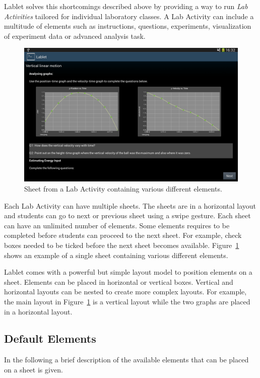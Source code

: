 \documentclass{sigchi}
\begin{document}
Lablet solves this shortcomings described above by providing a way to
run {\em Lab Activities} tailored for individual laboratory classes.
A Lab Activity can include a multitude of elements such as
instructions, questions, experiments, visualization of experiment
data or advanced analysis task.

\begin{figure}
  \centering
  \includegraphics[width=.99\columnwidth]{LabActivitySheet}
  \caption{Sheet from a Lab Activity containing various different
    elements.}
  \label{fig:LabActivitySheet} 
\end{figure}

Each Lab Activity can have multiple sheets.  The sheets are in a
horizontal layout and students can go to next or previous sheet using
a swipe gesture.  Each sheet can have an unlimited number of elements.
Some elements requires to be completed before students can proceed to
the next sheet.  For example, check boxes needed to be ticked before
the next sheet becomes available.  Figure~\ref{fig:LabActivitySheet}
shows an example of a single sheet containing various different
elements.

Lablet comes with a powerful but simple layout model to position
elements on a sheet.  Elements can be placed in horizontal or vertical
boxes.  Vertical and horizontal layouts can be nested to create more
complex layouts.  For example, the main layout in
Figure~\ref{fig:LabActivitySheet} is a vertical layout while the two
graphs are placed in a horizontal layout.

\subsection{Default Elements}
In the following a brief description of the available elements that
can be placed on a sheet is given.
\end{document}
